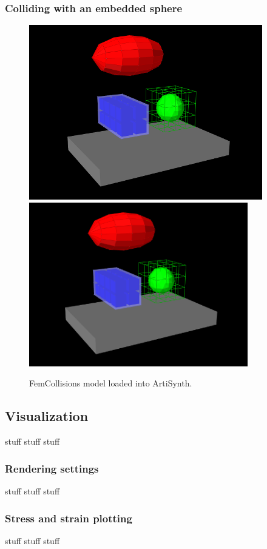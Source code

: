 
\subsubsection{Colliding with an embedded sphere}

\begin{figure}[ht]
\begin{center}
\iflatexml
 \includegraphics[]{images/FemCollisions}
\else
 \includegraphics[width=3.75in]{images/FemCollisions}
\fi
\end{center}
\caption{FemCollisions model loaded into ArtiSynth.}
\label{FemCollisions:fig}
\end{figure}

\subsection{Visualization}

stuff stuff stuff

\subsubsection{Rendering settings}

stuff stuff stuff

\subsubsection{Stress and strain plotting}

stuff stuff stuff
